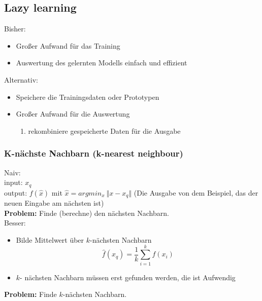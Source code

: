 	\subsection{Lazy learning}
	Bisher:
	\begin{itemize}
		\item Großer Aufwand für das Training
		\item Auswertung des gelernten Modells einfach und effizient
	\end{itemize}
	Alternativ:
	\begin{itemize}
		\item Speichere die Trainingsdaten oder Prototypen
		\item Großer Aufwand für die Auswertung\vspace*{-3pt}
		\begin{enumerate}[$\hookrightarrow$]
			\item rekombiniere gespeicherte Daten für die Ausgabe
		\end{enumerate}
	\end{itemize}
	\subsubsection{K-nächste Nachbarn (k-nearest neighbour)}
	Naiv:\\[5pt]
	input: $x_q$\\
	output: $f(\hat{x})$ mit $\hat{x} = argmin_x~\Vert x-x_q\Vert$ (Die Ausgabe von dem Beispiel, das der neuen Eingabe am nächsten ist)\\[5pt]
	\textbf{Problem:} Finde (berechne) den nächsten Nachbarn.\\[5pt]
	Besser:
	\begin{itemize}
		\item Bilde Mittelwert über $k$-nächsten Nachbarn
		\begin{equation*}
			\hat{f}(x_q) = \frac{1}{k}\sum_{i=1}^k f(x_i)
		\end{equation*}
		\item $k$- nächsten Nachbarn müssen erst gefunden werden, die ist Aufwendig
	\end{itemize}
	\textbf{Problem:} Finde $k$-nächsten Nachbarn.
